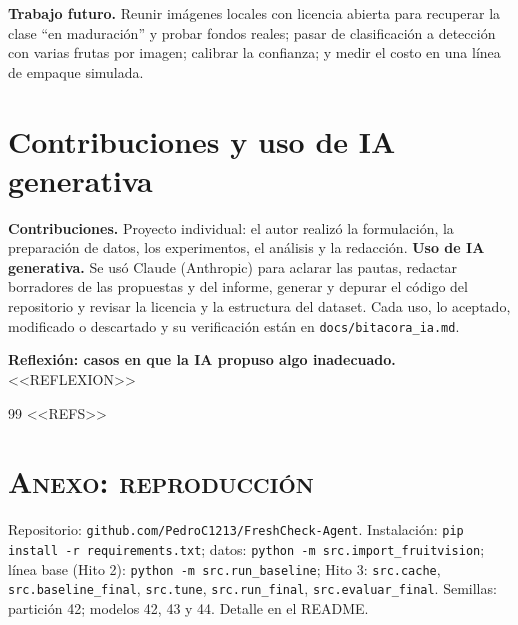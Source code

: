 \documentclass[10pt,twocolumn,letterpaper]{article}
\begin{document}
\textbf{Trabajo futuro.} Reunir imágenes locales con licencia abierta para recuperar la clase ``en maduración'' y probar fondos reales; pasar de clasificación a detección con varias frutas por imagen; calibrar la confianza; y medir el costo en una línea de empaque simulada.

\section{Contribuciones y uso de IA generativa}
\textbf{Contribuciones.} Proyecto individual: el autor realizó la formulación, la preparación de datos, los experimentos, el análisis y la redacción. \textbf{Uso de IA generativa.} Se usó Claude (Anthropic) para aclarar las pautas, redactar borradores de las propuestas y del informe, generar y depurar el código del repositorio y revisar la licencia y la estructura del dataset. Cada uso, lo aceptado, modificado o descartado y su verificación están en \texttt{docs/bitacora\_ia.md}.

\textbf{Reflexión: casos en que la IA propuso algo inadecuado.} <<REFLEXION>>

\begin{thebibliography}{99}\footnotesize
<<REFS>>
\end{thebibliography}

\section*{\centering\small\scshape Anexo: reproducción}\footnotesize
Repositorio: \texttt{github.com/PedroC1213/FreshCheck-Agent}. Instalación: \texttt{pip install -r requirements.txt}; datos: \texttt{python -m src.import\_fruitvision}; línea base (Hito 2): \texttt{python -m src.run\_baseline}; Hito 3: \texttt{src.cache}, \texttt{src.baseline\_final}, \texttt{src.tune}, \texttt{src.run\_final}, \texttt{src.evaluar\_final}. Semillas: partición 42; modelos 42, 43 y 44. Detalle en el README.
\end{document}

